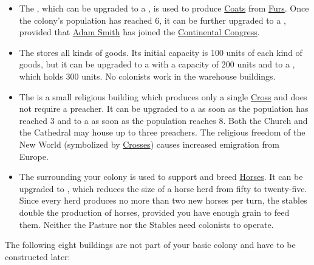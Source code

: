 \documentclass[12pt]{book}
\begin{document}
\begin{itemize}
\item The , which can be upgraded to a
  , is used to produce
  \hyperlink{Coats}{Coats} from \hyperlink{Furs}{Furs}. Once the
  colony's population has reached 6, it can be further upgraded to a
  , provided that \hyperlink{Adam Smith}{Adam
  Smith} has joined the \hyperlink{Continental Congress}{Continental
  Congress}.

\item The  stores all kinds of goods. Its initial
  capacity is 100 units of each kind of goods, but it can be upgraded
  to a  with a capacity of 200 units and to a
  , which holds 300 units. No colonists
  work in the warehouse buildings.

\item The  is a small religious building which
  produces only a single \hyperlink{Crosses}{Cross} and does not
  require a preacher. It can be upgraded to a  as
  soon as the population has reached 3 and to a 
  as soon as the population reaches 8. Both the Church and the
  Cathedral may house up to three preachers. The religious freedom of
  the New World (symbolized by \hyperlink{Crosses}{Crosses}) causes
  increased emigration from Europe.

\item The  surrounding your colony is used to
  support and breed \hyperlink{Horses}{Horses}. It can be upgraded to
  , which reduces the size of a horse herd from
  fifty to twenty-five. Since every herd produces no more than two new
  horses per turn, the stables double the production of horses,
  provided you have enough grain to feed them. Neither the Pasture nor
  the Stables need colonists to operate.

\end{itemize}

The following eight buildings are not part of your basic colony and
have to be constructed later:
\end{document}
